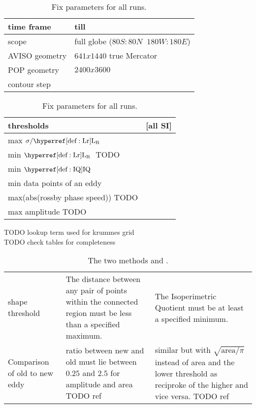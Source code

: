 
\begin{table}
	\begin{tabularx}{\textwidth}{|X|X|}
	\hline
	time frame &  \displaydate{runsStart} till \displaydate{runsEnd}\\
	\hline
	scope & full globe ($80S:80N \;\; 180W:180E$) \\
	\hline
	AVISO geometry &   $641 x 1440$ true Mercator \\
	\hline
	POP   geometry &   $2400 x 3600$ \\
	\hline
	contour step   &   \contourstep \\
	\hline
	\end{tabularx}
	\begin{tabularx}{\textwidth}{|X|X|}
	\hline
	\textbf{thresholds} &  [all SI]  \\
	\hline
	max $\sigma/\Lr$ & \threshmaxRadiusOverRossbyL \\
	\hline
	min $\Lr$ TODO & \threshminRossbyRadius \\
	\hline
	min $\IQ$ & \threshshapeiq \\
	\hline
	min data points of an eddy & \threshcornersmin \\
	\hline
	max(abs(rossby phase speed)) TODO & \threshphase \\
	\hline
		max amplitude TODO & \threshamp \\
	\hline
	\end{tabularx}
	\caption{Fix parameters for all runs.}
\label{tab:fixparams}
\end{table}
TODO lookup term used for krummes grid\\
TODO check tables for completeness\\


\begin{table}
	\begin{tabularx}{\textwidth}{|X||X|X|}
	\hline
	 & \MI & \MII   \\
	\hline
shape threshold & The distance between any pair of points within the connected region must be less than a specified maximum. & The Isoperimetric Quotient must be at least a specified minimum.\\
	\hline
Comparison of old to new eddy & ratio between new and old must lie between $0.25$ and $2.5$ for amplitude and area TODO ref & similar but with $\sqrt{\mathrm{area}/\pi}$ instead of area and the lower threshold as reciproke of the higher and vice versa.   TODO ref \\
	\hline
	\end{tabularx}
	\caption{The two methods \MI and \MII.}
\label{tab:MIMIIdiffs}
\end{table}
